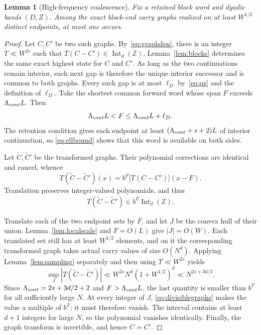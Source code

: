 \documentclass[10pt,a4paper]{amsart}
\newtheorem{lemma}[theorem]{Lemma}
\newcommand{\Z}{\mathbb Z}
\newcommand{\Int}{\operatorname{Int}}
\begin{document}
\begin{lemma}[High-frequency coalescence]\label{lem:coalescence}
Fix a retained block word and dyadic bands $(D,Z)$. Among the exact block-end
carry graphs realized on at least $W^{1/2}$ distinct endpoints, at most one
occurs.
\end{lemma}

\begin{proof}
Let $C,C'$ be two such graphs. By~\eqref{eq:graphden}, there is an integer
$T\ll W^{2s}$ such that $T(C-C')\in\Int_d(\Z)$. Lemma~\ref{lem:blocks}
determines the same exact highest state for $C$ and $C'$. As long as the two
continuations remain interior, each next gap is therefore the unique
interior successor and is common to both graphs. Every such gap is at most
$\ell_D$ by~\eqref{eq:qz} and the definition of $\ell_D$. Take the shortest
common forward word whose span $F$ exceeds $\Lambda_{\rm cont}L$. Then
\[
 \Lambda_{\rm cont}L<F\le\Lambda_{\rm cont}L+\ell_D.
\]
The retention condition gives each endpoint at least
$(\Lambda_{\rm cont}+s+2)L$ of interior continuation, so
\eqref{eq:ellbound} shows that this word is available on both sides.

Let $\widetilde C,\widetilde C'$ be the transformed graphs. Their polynomial
corrections are identical and cancel, whence
\[
 T(\widetilde C-\widetilde C')(x)
 =b^F\bigl[T(C-C')\bigr](x-F).
\]
Translation preserves integer-valued polynomials, and thus
\begin{equation}\label{eq:divisiblegraphs}
 T(\widetilde C-\widetilde C')\in b^F\Int_d(\Z).
\end{equation}

Translate each of the two endpoint sets by $F$, and let $J$ be the convex
hull of their union. Lemma~\ref{lem:localscale} and $F=O(L)$ give
$|J|=O(W)$. Each translated set still has at least $W^{1/2}$ elements, and on
it the corresponding transformed graph takes actual carry values of size
$O(N^d)$. Applying Lemma~\ref{lem:sampling} separately and then using
$T\ll W^{2s}$ yields
\[
 \sup_J|T(\widetilde C-\widetilde C')|
 \ll W^{2s}N^d(1+W^{1/2})^d
 \ll N^{2s+3d/2}.
\]
Since $\Lambda_{\rm cont}=2s+3d/2+2$ and
$F>\Lambda_{\rm cont}L$, the last quantity is smaller than $b^F$ for all
sufficiently large $N$. At every integer of $J$,
\eqref{eq:divisiblegraphs} makes the value a multiple of $b^F$; it must
therefore vanish. The interval contains at least $d+1$ integers for large
$N$, so the polynomial vanishes identically. Finally, the graph transform is
invertible, and hence $C=C'$.
\end{proof}
\end{document}
